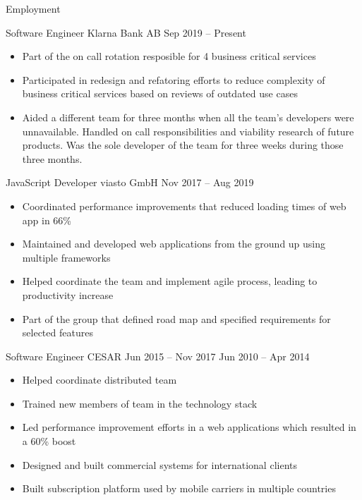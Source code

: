 \documentclass[]{mcdowellcv}
\begin{document}
	\makeheader

	\begin{cvsection}{Employment}
        \begin{cvsubsection}{Software Engineer} {Klarna Bank AB} {Sep 2019 -- Present}
            \begin{itemize}
                \item Part of the on call rotation resposible for 4 business critical services
                \item Participated in redesign and refatoring efforts to reduce complexity of business critical services based on reviews of outdated use cases
                \item Aided a different team for three months when all the team's developers were unnavailable. Handled on call responsibilities and viability research of future products. Was the sole developer of the team for three weeks during those three months.
            \end{itemize}
        \end{cvsubsection}

        \begin{cvsubsection}{JavaScript Developer} {viasto GmbH} {Nov 2017 -- Aug 2019}
            \begin{itemize}
                \item Coordinated performance improvements that reduced loading times of web app in 66\%
                \item Maintained and developed web applications from the ground up using multiple frameworks
                \item Helped coordinate the team and implement agile process, leading to productivity increase
                \item Part of the group that defined road map and specified requirements for selected features
            \end{itemize}
        \end{cvsubsection}

		\begin{cvsubsection}{Software Engineer} {CESAR} {Jun 2015 -- Nov 2017 \linebreak Jun 2010 -- Apr 2014}
			\begin{itemize}
                \item Helped coordinate distributed team
                \item Trained new members of team in the technology stack
                \item Led performance improvement efforts in a web applications which resulted in a 60\% boost
                \item Designed and built commercial systems for international clients
                \item Built subscription platform used by mobile carriers in multiple countries
			\end{itemize}
		\end{cvsubsection}
	\end{cvsection}
\end{document}
